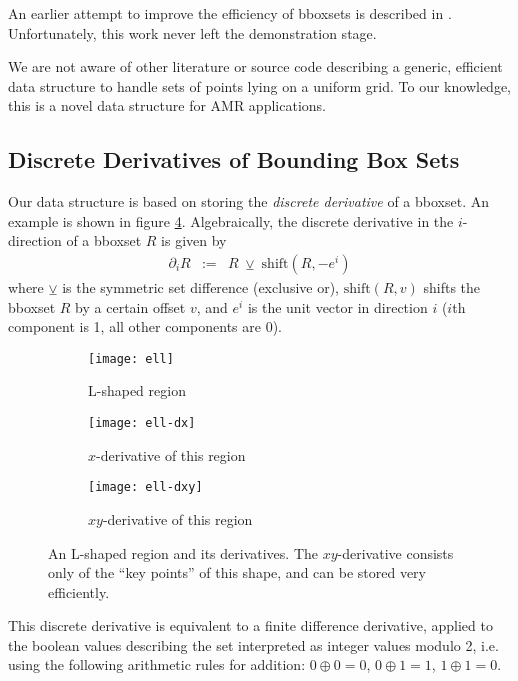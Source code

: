 \documentclass[conference]{IEEEtran}
\begin{document}
An earlier attempt to improve the efficiency of bboxsets is
described in \cite{Zebrowski:2011bl}. Unfortunately, this work never
left the demonstration stage.

We are not aware of other literature or source code describing a generic,
efficient data structure to handle sets of points lying on a uniform
grid. To our knowledge, this is a novel data structure for AMR
applications.

\subsection{Discrete Derivatives of Bounding Box Sets}

Our data structure is based on storing the \emph{discrete derivative}
of a bboxset. An example is shown in figure \ref{fig:derivatives}.
Algebraically, the discrete derivative in the $i$-direction of a
bboxset $R$ is given by
\begin{eqnarray}
  \partial_i R & := & R\; \veebar\; \mathrm{shift}(R, -e^i)
\end{eqnarray}
where $\veebar$ is the symmetric set difference (exclusive or),
$\mathrm{shift}(R, v)$ shifts the bboxset $R$ by a certain offset $v$,
and $e^i$ is the unit vector in direction $i$ ($i$th component is 1,
all other components are 0).

\begin{figure}
  \centering
  \begin{subfigure}[t]{0.27\linewidth}
    \centering
    \texttt{[image: ell]}
    \caption{L-shaped region}
    \label{fig:ell}
  \end{subfigure}
  \hfill
  \begin{subfigure}[t]{0.27\linewidth}
    \centering
    \texttt{[image: ell-dx]}
    \caption{$x$-derivative of this region}
    \label{fig:ell-dx}
  \end{subfigure}
  \hfill
  \begin{subfigure}[t]{0.27\linewidth}
    \centering
    \texttt{[image: ell-dxy]}
    \caption{$xy$-derivative of this region}
    \label{fig:ell-dxy}
  \end{subfigure}
  \caption{An L-shaped region and its derivatives. The $xy$-derivative
    consists only of the ``key points'' of this shape, and can be
    stored very efficiently.}
  \label{fig:derivatives}
\end{figure}

This discrete derivative is equivalent to a finite difference
derivative, applied to the boolean values describing the set
interpreted as integer values modulo 2, i.e. using the
following arithmetic rules for addition: $0 \oplus 0 = 0$, $0 \oplus 1
= 1$, $1 \oplus 1 = 0$.
\end{document}
